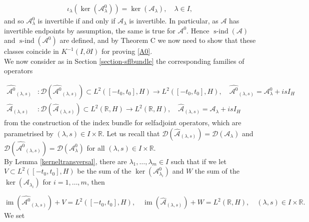 \documentclass[a4paper,10pt]{article}
\DeclareMathOperator{\im}{im}
\DeclareMathOperator{\sind}{s-ind}
\begin{document}
\begin{align}\label{iota}
\iota_\lambda(\ker(\mathcal{A}^0_\lambda))=\ker(\mathcal{A}_\lambda), \quad\lambda\in I,
\end{align}
and so $\mathcal{A}^0_\lambda$ is invertible if and only if $\mathcal{A}_\lambda$ is invertible. In particular, as $\mathcal{A}$ has invertible endpoints by assumption, the same is true for $\mathcal{A}^0$. Hence $\sind(\mathcal{A})$ and $\sind(\mathcal{A}^0)$ are defined, and by Theorem C we now need to show that these classes coincide in $K^{-1}(I,\partial I)$ for proving \eqref{A0}.\\
We now consider as in Section \ref{section-sflbundle} the corresponding families of operators

\begin{align*}
\hat{\mathcal{A}^0}_{(\lambda,s)}&:\mathcal{D}(\hat{\mathcal{A}^0}_{(\lambda,s)})\subset L^2([-t_0,t_0],H)\rightarrow L^2([-t_0,t_0],H),\quad \hat{\mathcal{A}^0}_{(\lambda,s)}=\mathcal{A}^0_\lambda+isI_H\\
 \hat{\mathcal{A}}_{(\lambda,s)}&:\mathcal{D}(\hat{\mathcal{A}}_{(\lambda,s)})\subset L^2(\mathbb{R},H)\rightarrow L^2(\mathbb{R},H),\quad \hat{\mathcal{A}}_{(\lambda,s)}=\mathcal{A}_\lambda+isI_H
\end{align*}
from the construction of the index bundle for selfadjoint operators, which are parametrised by $(\lambda,s)\in I\times\mathbb{R}$. Let us recall that $\mathcal{D}(\hat{\mathcal{A}}_{(\lambda,s)})=\mathcal{D}(\mathcal{A}_\lambda)$ and $\mathcal{D}(\hat{\mathcal{A}^0}_{(\lambda,s)})=\mathcal{D}(\mathcal{A}^0_\lambda)$ for all $(\lambda,s)\in I\times\mathbb{R}$.\\
By Lemma \ref{kerneltransversal}, there are $\lambda_1,\ldots,\lambda_m\in I$ such that if we let $V\subset L^2([-t_0,t_0],H)$ be the sum of the $\ker(\mathcal{A}^0_{\lambda_i})$ and $W$ the sum of the $\ker(\mathcal{A}_{\lambda_i})$ for $i=1,\ldots,m$, then 

\[\im(\hat{\mathcal{A}^0}_{(\lambda,s)})+V=L^2([-t_0,t_0],H),\quad \im(\hat{\mathcal{A}}_{(\lambda,s)})+W=L^2(\mathbb{R},H),\quad (\lambda,s)\in I\times\mathbb{R}.\] 
We set
\end{document}

